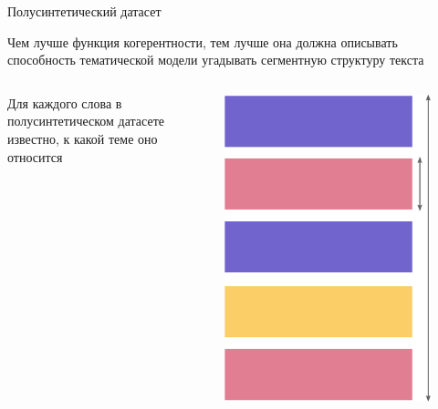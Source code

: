 \documentclass[russian]{beamer}
\begin{document}
\begin{frame}{Полусинтетический датасет}
  \begin{block}{}
    Чем лучше функция когерентности, тем лучше она должна описывать способность тематической модели угадывать сегментную структуру текста
  \end{block}
  
  \begin{columns}
  
  Для каждого слова в полусинтетическом датасете известно, к какой теме оно относится
  
  
  \begin{figure}[b]
    \includegraphics[width=\linewidth, height=0.5\textheight]{dataset.eps} %
  \end{figure}
  \end{columns}
\end{frame}
\end{document}
